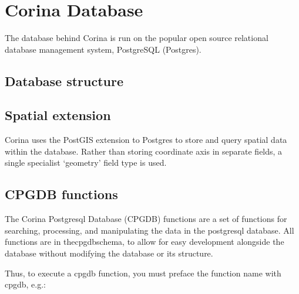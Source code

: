\chapter{Corina Database}

The database behind Corina is run on the popular open source relational database management system, PostgreSQL (Postgres). 


\section{Database structure}


\section{Spatial extension}

Corina uses the PostGIS extension to Postgres to store and query spatial data within the database.  Rather than storing coordinate axis in separate fields, a single specialist `geometry' field type is used.


\section{CPGDB functions}

The Corina Postgresql Database (CPGDB) functions are a set of functions for searching, processing, and manipulating the data in the postgresql database. All functions are in thecpgdbschema, to allow for easy development alongside the database without modifying the database or its structure.

Thus, to execute a cpgdb function, you must preface the function name with cpgdb, e.g.: 




